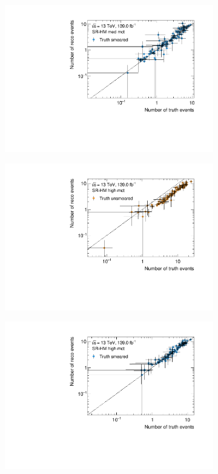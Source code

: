 \begin{figure}
\begin{subfigure}[b]{0.49\linewidth}
	\end{subfigure}\hfill
	\begin{subfigure}[b]{0.49\linewidth}
		\centering\includegraphics[width=\textwidth]{yields_SR-HM_med_mct_smeared}
	\end{subfigure}\hfill
	\begin{subfigure}[b]{0.49\linewidth}
		\centering\includegraphics[width=\textwidth]{yields_SR-HM_high_mct_unsmeared}
	\end{subfigure}\hfill
	\begin{subfigure}[b]{0.49\linewidth}
		\centering\includegraphics[width=\textwidth]{yields_SR-HM_high_mct_smeared}

\end{subfigure}
\end{figure}
